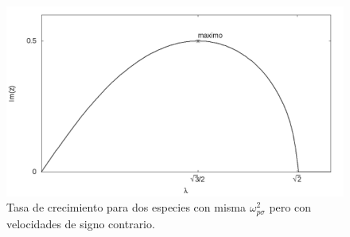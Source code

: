\documentclass[../tesis_main_file.tex]{subfiles}
\begin{document}
\begin{figure}
\includegraphics[height=0.3\paperheight]{grafica_misma_omega_contrarias.png}
\caption{Tasa de crecimiento para dos especies con misma $\omega_{p\sigma}^2$ pero con velocidades de signo contrario.}
\label{fig:misma_omega_tasa_de_crecimiento}
\end{figure}
\end{document}
